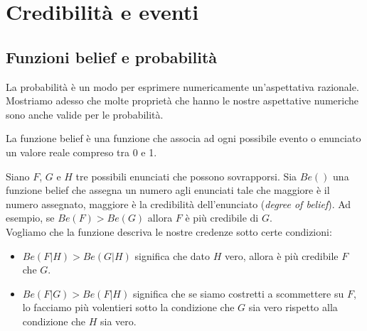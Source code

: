\documentclass[../main.tex]{subfiles}
\begin{document}
\chapter{Credibilità e eventi}
\section{Funzioni belief e probabilità}
La probabilità è un modo per esprimere numericamente un'aspettativa razionale.
Mostriamo adesso che molte proprietà che hanno le nostre aspettative numeriche sono anche valide per le probabilità.

\begin{definition}
    \label{def:funzione_belief}
    La funzione belief è una funzione che associa ad ogni possibile evento o enunciato un valore reale compreso tra 0 e 1.
\end{definition}
\hfill \break
Siano $F$, $G$ e $H$ tre possibili enunciati che possono sovrapporsi.
Sia $Be()$ una funzione belief che assegna un numero agli enunciati tale che maggiore è il numero assegnato, maggiore è la credibilità dell'enunciato (\textit{degree of belief}).
Ad esempio, se $Be(F) > Be(G)$ allora $F$ è più credibile di $G$.\\
Vogliamo che la funzione descriva le nostre credenze sotto certe condizioni:
\begin{itemize}
    \item $Be(F|H) > Be(G|H)$ significa che dato $H$ vero, allora è più credibile $F$ che $G$.
    \item $Be(F|G) > Be(F|H)$ significa che se siamo costretti a scommettere su $F$, lo facciamo più volentieri sotto la condizione che $G$ sia vero rispetto alla condizione che $H$ sia vero.
\end{itemize}
\end{document}
